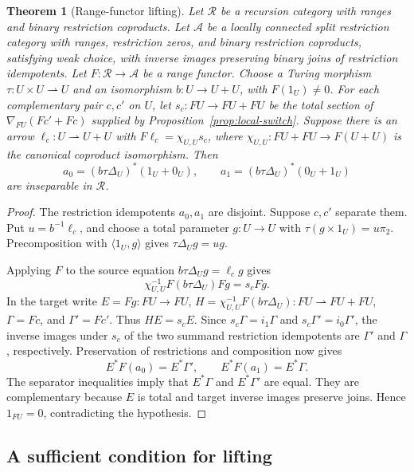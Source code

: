 \documentclass[11pt]{article}
\newtheorem{theorem}{Theorem}[section]
\begin{document}
\begin{theorem}[Range-functor lifting]\label{thm:local-lifting}
Let $\mathscr R$ be a recursion category with ranges and
binary restriction coproducts. Let $\mathcal A$ be a locally connected
split restriction category with ranges, restriction zeros, and binary
restriction coproducts, satisfying weak choice, with inverse images
preserving binary joins of restriction idempotents. Let
$F:\mathscr R\to\mathcal A$ be a range functor.
Choose a Turing morphism $\tau:U\times U\rightharpoonup U$ and
an isomorphism $b:U\to U+U$, with $F(1_U)\ne0$.
For each complementary pair $c,c'$ on $U$, let
$s_c:FU\to FU+FU$ be the total section of $\nabla_{FU}(Fc'+Fc)$ supplied by
Proposition~\ref{prop:local-switch}. Suppose there is an arrow
$\ell_c:U\rightharpoonup U+U$ with
$F\ell_c=\chi_{U,U}s_c$, where
$\chi_{U,U}:FU+FU\to F(U+U)$ is the canonical coproduct isomorphism.
Then
\[
 a_0=(b\tau\Delta_U)^*(1_U+0_U),\qquad
 a_1=(b\tau\Delta_U)^*(0_U+1_U)
\]
are inseparable in $\mathscr R$.
\end{theorem}
\begin{proof}
The restriction idempotents $a_0,a_1$ are disjoint. Suppose $c,c'$ separate them.
Put $u=b^{-1}\ell_c$, and choose a total parameter $g:U\to U$ with
$\tau(g\times1_U)=u\pi_2$. Precomposition with $\langle1_U,g\rangle$
gives $\tau\Delta_Ug=ug$.

Applying $F$ to the source equation
$b\tau\Delta_Ug=\ell_cg$ gives
\[
 \chi_{U,U}^{-1}F(b\tau\Delta_U)Fg=s_cFg.
\]
In the target write $E=Fg:FU\to FU$,
$H=\chi_{U,U}^{-1}F(b\tau\Delta_U):FU\rightharpoonup FU+FU$,
$\Gamma=Fc$, and $\Gamma'=Fc'$. Thus $HE=s_cE$.
Since $s_c\Gamma=i_1\Gamma$ and $s_c\Gamma'=i_0\Gamma'$,
the inverse images under $s_c$ of the two summand restriction idempotents are
$\Gamma'$ and $\Gamma$,
respectively. Preservation of restrictions and composition now gives
\[
 E^*F(a_0)=E^*\Gamma',\qquad E^*F(a_1)=E^*\Gamma.
\]
The separator inequalities imply that $E^*\Gamma$ and $E^*\Gamma'$
are equal. They are complementary because $E$ is total and target
inverse images preserve joins. Hence $1_{FU}=0$, contradicting the
hypothesis.
\end{proof}

\subsection{A sufficient condition for lifting}
\end{document}
